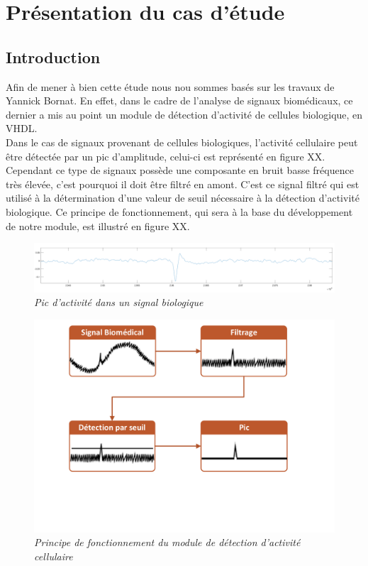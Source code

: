 \documentclass[a4paper,12pt]{article}
\begin{document}
\section{Présentation du cas d'étude}
\subsection{Introduction}
Afin de mener à bien cette étude nous nou sommes basés sur les travaux de Yannick Bornat. En effet, dans le cadre de l'analyse de signaux biomédicaux, ce dernier a mis au point un module de détection d'activité de cellules biologique, en VHDL.\\

Dans le cas de signaux provenant de cellules biologiques, l'activité cellulaire peut être détectée par un pic d'amplitude, celui-ci est représenté en figure XX. Cependant ce type de signaux possède une composante en bruit basse fréquence très élevée, c'est pourquoi il doit être filtré en amont. C'est ce signal filtré qui est utilisé à la détermination d'une valeur de seuil nécessaire à la détection d'activité biologique. Ce principe de fonctionnement, qui sera à la base du développement de notre module, est illustré en figure XX.\\

\begin{figure}[H]
\centering
\includegraphics[scale=0.18, keepaspectratio]{toto3.png}
\caption{\textit{Pic d'activité dans un signal biologique}}
\end{figure}

\begin{figure}[H]
\centering
\includegraphics[scale=0.5, keepaspectratio]{Dessin1.pdf}
\caption{\textit{Principe de fonctionnement du module de détection d'activité cellulaire}}
\end{figure}
\newpage
\end{document}
